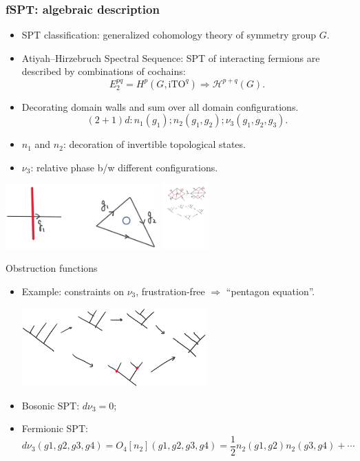 \documentclass[xcolor=table, 11pt, aspectratio=169]{beamer}
\begin{document}
    \begin{frame}
      \frametitle{fSPT: algebraic description}
      \begin{itemize}
        \item SPT classification: generalized cohomology theory of symmetry group $G$.
        \item Atiyah–Hirzebruch Spectral Sequence: SPT of interacting fermions are described by combinations of cochains:
          \[E^{pq}_2=H^p(G, \text{iTO}^q)\Rightarrow
          \mathcal H^{p+q}(G).\]
        \item Decorating domain walls and sum over all domain configurations.
          \[(2+1)d: n_1(g_1); n_2(g_1, g_2); \nu_3(g_1,g_2,g_3).\]
        \item $n_1$ and $n_2$: decoration of invertible topological states.
        \item $\nu_3$: relative phase b/w different configurations.
      \end{itemize}
      \begin{center}
        \includegraphics[height=2.5cm]{../spspt/fspt_decor.jpg}
        \includegraphics[height=2.5cm]{../spspt/fmove2.pdf}
      \end{center}
    \end{frame}
    
    \begin{frame}{Obstruction functions}
      \begin{itemize}
        \item Example: constraints on $\nu_3$, frustration-free $\Rightarrow$ ``pentagon equation''.
        \begin{center}
          \includegraphics[height=3cm]{../spspt/pentagon}        
        \end{center}
        \item Bosonic SPT: $d\nu_3=0$;
        \item Fermionic SPT:
        \[d\nu_3(g1, g2, g3, g4)=O_4[n_2](g1, g2, g3, g4)=\frac12 n_2(g1, g2) n_2(g3, g4) + \cdots\]
      \end{itemize}
    \end{frame}
    
\end{document}

